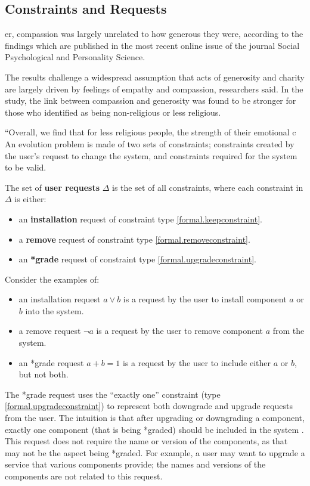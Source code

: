\subsection{Constraints and Requests}
\label{formal.constraints}er, compassion was largely unrelated to how generous they were, according to the findings which are published in the most recent online issue of the journal Social Psychological and Personality Science.

The results challenge a widespread assumption that acts of generosity and charity are largely driven by feelings of empathy and compassion, researchers said. In the study, the link between compassion and generosity was found to be stronger for those who identified as being non-religious or less religious.

“Overall, we find that for less religious people, the strength of their emotional c
An evolution problem is made of two sets of constraints; constraints created by the user's request to change the system, 
and constraints required for the system to be valid.

\begin{defs}
The set of \textbf{user requests} $\Delta$ is the set of all constraints, where each constraint in $\Delta$ is either:
\begin{itemize}
  \item an \textbf{installation} request of constraint type \ref{formal.keepconstraint}.
  \item a \textbf{remove} request of constraint type \ref{formal.removeconstraint}.
  \item an \textbf{*grade} request of constraint type \ref{formal.upgradeconstraint}.
\end{itemize}
\end{defs}

Consider the examples of:
\begin{itemize}
  \item an installation request $a \vee b$ is a request by the user to install component $a$ or $b$ into the system.
  \item a remove request $\neg a$ is a request by the user to remove component $a$ from the system.
  \item an *grade request $a + b = 1$ is a request by the user to include either $a$ or $b$, but not both.
\end{itemize} 

The *grade request uses the ``exactly one'' constraint (type \ref{formal.upgradeconstraint}) to represent both downgrade and upgrade requests from the user.
The intuition is that after upgrading or downgrading a component, exactly one component (that is being *graded) should be included in the system \citep{treinen2009common}.
This request does not require the name or version of the components, as that may not be the aspect being *graded.
For example, a user may want to upgrade a service that various components provide; the names and versions of the components are not related to this request.

